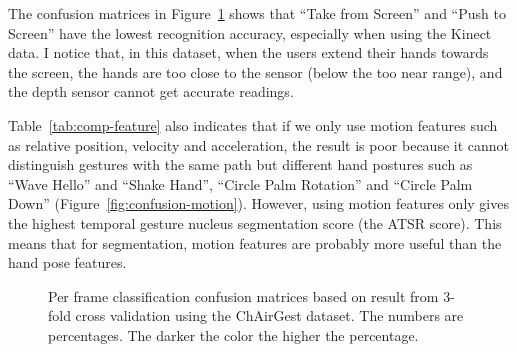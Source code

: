 The confusion matrices in Figure~\ref{fig:confusion2} shows that ``Take
from Screen'' and ``Push to Screen'' have the lowest recognition accuracy,
especially when using the Kinect data. I notice that, in this dataset, when the
users extend their hands towards the screen, the hands are too close to the sensor (below the too near range), and the depth sensor cannot get accurate readings.

Table~\ref{tab:comp-feature} also indicates that if we only use motion features
such as relative position, velocity and acceleration, the result is poor because it cannot distinguish gestures with
the same path but different hand postures such as ``Wave Hello'' and ``Shake
Hand'', ``Circle Palm Rotation'' and ``Circle Palm Down''
(Figure~\ref{fig:confusion-motion}). However, using motion features only gives
the highest temporal gesture nucleus segmentation score (the ATSR score). This
means that for segmentation, motion features are probably more useful than the
hand pose features.

\begin{figure}[!hp]
\centering
{}
\caption{Per frame
classification confusion matrices based on result from 3-fold cross validation
using the ChAirGest dataset. The numbers are percentages. The darker
the color the higher the percentage.}
\label{fig:confusion2}
\end{figure}

